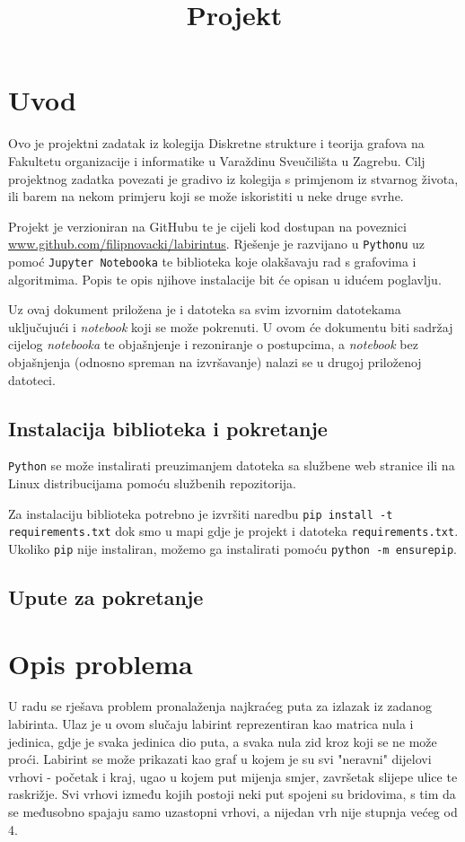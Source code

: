\documentclass[11pt]{article}
\title{Projekt}
\begin{document}
	
	

	\section{Uvod}
	Ovo je projektni zadatak iz kolegija Diskretne strukture i teorija grafova na Fakultetu organizacije i informatike u Varaždinu Sveučilišta u Zagrebu. Cilj projektnog zadatka povezati je gradivo iz kolegija s primjenom iz stvarnog života, ili barem na nekom primjeru koji se može iskoristiti u neke druge svrhe. 
	
	Projekt je verzioniran na GitHubu te je cijeli kod dostupan na poveznici \url{www.github.com/filipnovacki/labirintus}. Rješenje je razvijano u \texttt{Pythonu} uz pomoć \texttt{Jupyter Notebooka} te biblioteka koje olakšavaju rad s grafovima i algoritmima. Popis te opis njihove instalacije bit će opisan u idućem poglavlju.
	
	Uz ovaj dokument priložena je i datoteka sa svim izvornim datotekama uključujući i \textit{notebook} koji se može pokrenuti. U ovom će dokumentu biti sadržaj cijelog \textit{notebooka} te objašnjenje i rezoniranje o postupcima, a \textit{notebook} bez objašnjenja (odnosno spreman na izvršavanje) nalazi se u drugoj priloženoj datoteci.
	
	\subsection{Instalacija biblioteka i pokretanje}
	
	\texttt{Python} se može instalirati preuzimanjem datoteka sa službene web stranice ili na Linux distribucijama pomoću službenih repozitorija. 
	
	Za instalaciju biblioteka potrebno je izvršiti naredbu \texttt{pip install -t requirements.txt} dok smo u mapi gdje je projekt i datoteka \texttt{requirements.txt}. Ukoliko \texttt{pip} nije instaliran, možemo ga instalirati pomoću \texttt{python -m ensurepip}. 
	
	\subsection{Upute za pokretanje}
	
	
	
	\section{Opis problema}
	U radu se rješava problem pronalaženja najkraćeg puta za izlazak iz zadanog labirinta. Ulaz je u ovom slučaju labirint reprezentiran kao matrica nula i jedinica, gdje je svaka jedinica dio puta, a svaka nula zid kroz koji se ne može proći. Labirint se može prikazati kao graf u kojem je su svi "neravni" dijelovi vrhovi - početak i kraj, ugao u kojem put mijenja smjer, završetak slijepe ulice te raskrižje. Svi vrhovi između kojih postoji neki put spojeni su bridovima, s tim da se međusobno spajaju samo uzastopni vrhovi, a nijedan vrh nije stupnja većeg od 4. 
	
\end{document}

